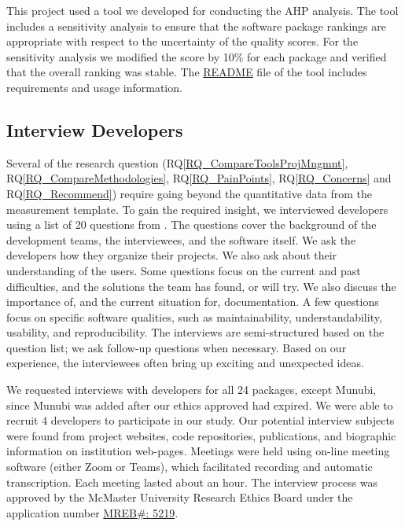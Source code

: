 \documentclass[final, 3p, times, authoryear]{elsarticle}
\newcommand{\rqref}[1]{RQ\ref{#1}}
\begin{document}
This project used a tool we developed for conducting the AHP analysis. The tool
includes a sensitivity analysis to ensure that the software package rankings are
appropriate with respect to the uncertainty of the quality scores. For the
sensitivity analysis we modified the score by 10\% for each package and verified
that the overall ranking was stable.  The
\href{https://github.com/smiths/AIMSS/blob/master/StateOfPractice/AHP2020/LBM/README.txt}{README}
file of the tool includes requirements and usage information.

\subsection{Interview Developers} \label{SecSurvey}

Several of the research question (\rqref{RQ_CompareToolsProjMngmnt},
\rqref{RQ_CompareMethodologies}, \rqref{RQ_PainPoints}, \rqref{RQ_Concerns} and
\rqref{RQ_Recommend}) require going beyond the quantitative data from the
measurement template. To gain the required insight, we interviewed developers
using a list of 20 questions from \citet{SmithEtAl2021}. The questions cover the
background of the development teams, the interviewees, and the software itself.
We ask the developers how they organize their projects. We also ask about their
understanding of the users. Some questions focus on the current and past
difficulties, and the solutions the team has found, or will try. We also discuss
the importance of, and the current situation for, documentation. A few questions
focus on specific software qualities, such as maintainability,
understandability, usability, and reproducibility. The interviews are
semi-structured based on the question list; we ask follow-up questions when
necessary. Based on our experience, the interviewees often bring up exciting and
unexpected ideas.

We requested interviews with developers for all 24 packages, except Munubi,
since Munubi was added after our ethics approved had expired.  We were able to
recruit 4 developers to participate in our study.  Our potential interview
subjects were found from project websites, code repositories, publications, and
biographic information on institution web-pages. Meetings were held using on-line meeting software (either Zoom or Teams), which facilitated recording and
automatic transcription.  Each meeting lasted about an hour. The interview
process was approved by the McMaster University Research Ethics Board under the
application number 
\href{https://github.com/smiths/AIMSS/blob/master/StateOfPractice/MACREM/Application.pdf}
{MREB\#: 5219}.
\end{document}
